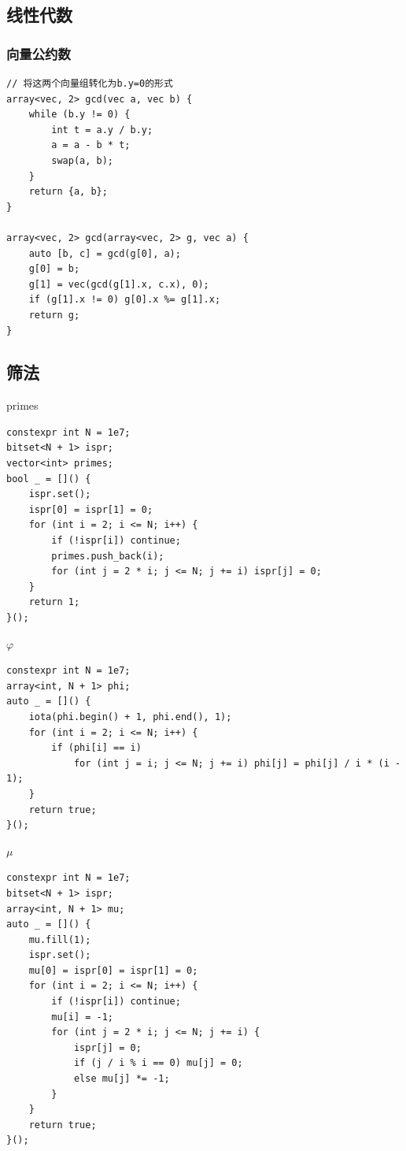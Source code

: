 \documentclass[UTF8, twoside]{ctexart}
\begin{document}
\begin{sloppypar}
\subsection{线性代数}

\subsubsection{向量公约数}

\begin{lstlisting}[style=cpp]
// 将这两个向量组转化为b.y=0的形式
array<vec, 2> gcd(vec a, vec b) {
    while (b.y != 0) {
        int t = a.y / b.y;
        a = a - b * t;
        swap(a, b);
    }
    return {a, b};
}

array<vec, 2> gcd(array<vec, 2> g, vec a) {
    auto [b, c] = gcd(g[0], a);
    g[0] = b;
    g[1] = vec(gcd(g[1].x, c.x), 0);
    if (g[1].x != 0) g[0].x %= g[1].x;
    return g;
}
\end{lstlisting}

\subsection{筛法}

primes

\begin{lstlisting}[style=cpp]
constexpr int N = 1e7;
bitset<N + 1> ispr;
vector<int> primes;
bool _ = []() {
    ispr.set();
    ispr[0] = ispr[1] = 0;
    for (int i = 2; i <= N; i++) {
        if (!ispr[i]) continue;
        primes.push_back(i);
        for (int j = 2 * i; j <= N; j += i) ispr[j] = 0;
    }
    return 1;
}();
\end{lstlisting}

$\varphi$

\begin{lstlisting}[style=cpp]
constexpr int N = 1e7;
array<int, N + 1> phi;
auto _ = []() {
    iota(phi.begin() + 1, phi.end(), 1);
    for (int i = 2; i <= N; i++) {
        if (phi[i] == i)
            for (int j = i; j <= N; j += i) phi[j] = phi[j] / i * (i - 1);
    }
    return true;
}();
\end{lstlisting}

$\mu$

\begin{lstlisting}[style=cpp]
constexpr int N = 1e7;
bitset<N + 1> ispr;
array<int, N + 1> mu;
auto _ = []() {
    mu.fill(1);
    ispr.set();
    mu[0] = ispr[0] = ispr[1] = 0;
    for (int i = 2; i <= N; i++) {
        if (!ispr[i]) continue;
        mu[i] = -1;
        for (int j = 2 * i; j <= N; j += i) {
            ispr[j] = 0;
            if (j / i % i == 0) mu[j] = 0;
            else mu[j] *= -1;
        }
    }
    return true;
}();
\end{lstlisting}


\end{sloppypar}
\end{document}
